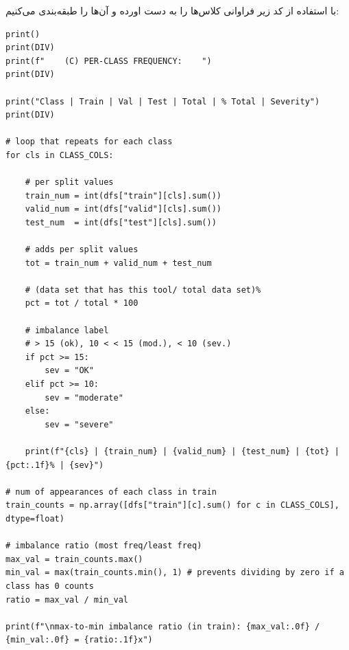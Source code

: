 \documentclass{article}
\begin{document}
با استفاده از کد زیر فراوانی کلاس‌ها را به دست اورده و آن‌ها را طبقه‌بندی می‌کنیم:

\begin{latin}
\begin{LTR}
\begin{verbatim}
print()
print(DIV)
print(f"    (C) PER-CLASS FREQUENCY:    ")
print(DIV)

print("Class | Train | Val | Test | Total | % Total | Severity")
print(DIV)

# loop that repeats for each class
for cls in CLASS_COLS:

    # per split values
    train_num = int(dfs["train"][cls].sum())
    valid_num = int(dfs["valid"][cls].sum())
    test_num  = int(dfs["test"][cls].sum())

    # adds per split values 
    tot = train_num + valid_num + test_num

    # (data set that has this tool/ total data set)%
    pct = tot / total * 100

    # imbalance label 
    # > 15 (ok), 10 < < 15 (mod.), < 10 (sev.)
    if pct >= 15:
        sev = "OK"
    elif pct >= 10:
        sev = "moderate"
    else:
        sev = "severe"

    print(f"{cls} | {train_num} | {valid_num} | {test_num} | {tot} | {pct:.1f}% | {sev}")

# num of appearances of each class in train
train_counts = np.array([dfs["train"][c].sum() for c in CLASS_COLS], dtype=float)

# imbalance ratio (most freq/least freq)
max_val = train_counts.max()
min_val = max(train_counts.min(), 1) # prevents dividing by zero if a class has 0 counts
ratio = max_val / min_val

print(f"\nmax-to-min imbalance ratio (in train): {max_val:.0f} / {min_val:.0f} = {ratio:.1f}x")
\end{verbatim}
\end{LTR}
\end{latin}
\end{document}
